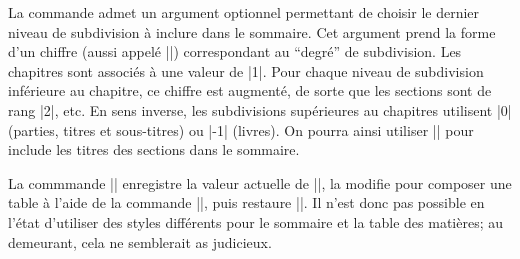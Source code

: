 \begin{macro}
	\shortcontents
	\shortcontents*
\end{macro}

La commande admet un argument optionnel permettant de choisir le dernier niveau de subdivision à inclure dans le sommaire. Cet argument prend la forme d'un chiffre (aussi appelé |\tocdepth|) correspondant au \enquote{degré} de subdivision. Les chapitres sont associés à une valeur de |1|. Pour chaque niveau de subdivision inférieure au chapitre, ce chiffre est augmenté, de sorte que les sections sont de rang |2|, etc. En sens inverse, les subdivisions supérieures au chapitres utilisent |0| (parties, titres et sous-titres) ou |-1| (livres). On pourra ainsi utiliser |\shortcontents[2]| pour include les titres des sections dans le sommaire.

\begin{noprint}
\newcommand{\shortcontents}{\@ifstar{\s@shortcontents}{\@shortcontents}}

\newcommand{\s@shortcontents}[1][0]{%
	\@@shortcontents[#1]{\tableofcontents*}
}
\newcommand{\@shortcontents}[1][0]{%
	\@@shortcontents[#1]{\tableofcontents}
}

\newcommand{\@@shortcontents}[2][]{
	\bgroup
		\let\contentsname=\shortcontentsname
		\cftpagenumbersoff{heading}
		\cftpagenumbersoff{subheading}
		\cftpagenumbersoff{chapter}
		\cftpagenumbersoff{section}
		\cftpagenumbersoff{subsection}
		\cftpagenumbersoff{subsubsection}
		\cftpagenumbersoff{paragraph}
		\cftpagenumbersoff{subparagraph}
		\@precisfalse
		\@subprecisfalse
		\let\cftafterprecis=\relax
		\let\cftbeforeprecis=\relax
		\newcounter{save@tocdepth}
		\setcounter{save@tocdepth}{\value{tocdepth}}
		\setcounter{tocdepth}{#1}
		#2
		\setcounter{tocdepth}{\value{save@tocdepth}}
		\clearpage
	\egroup}
\end{noprint}

\begin{developer}
La commmande |\shortcontents| enregistre la valeur actuelle de |\tocdepth|, la modifie pour composer une table à l'aide de la commande |\tableofcontents|, puis restaure |\tocdepth|. Il n'est donc pas possible en l'état d'utiliser des styles différents pour le sommaire et la table des matières; au demeurant, cela ne semblerait as judicieux.
\end{developer}

